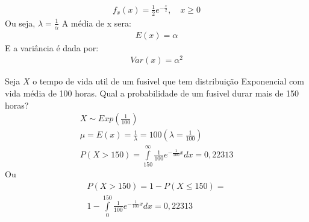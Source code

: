 \begin{description}
\begin{obs}
          \begin{align*}
            f_{x} (x)= \frac{1}{2}e^{-\frac{x}{2}}, \quad x\ge 0
          \end{align*}
          Ou seja, $\lambda= \frac{1}{\alpha}$
          A média de x sera:
          \begin{align*}
            E(x)  = \alpha
          \end{align*}
          E a variância é dada por:
          \begin{align*}
            Var(x) = \alpha^2
          \end{align*}
        \end{obs}
        \begin{example}Seja $X$ o tempo de vida util de um fusivel que tem distribuição Exponencial
          com vida média de 100 horas. Qual a probabilidade de um fusivel durar mais de 150
          horas?
          \begin{align*}
            X \sim  Exp(\frac{1}{100}) \\
            \mu = E(x)= \frac{1}{\lambda}=100 \left( \lambda= \frac{1}{100} \right)\\
            P(X> 150)= \int \limits_{150}^{\infty} \frac{1}{100} e^{- \frac{1}{100} x} dx =0,22313
          \end{align*}
          Ou 
          \begin{align*}
            P(X>150) = 1- P(X \le 150)=\\ 1- \int \limits_{0}^{150} \frac{1}{100} e^{- \frac{1}{100}x}dx          = 0,22313
          \end{align*}
      \end{example}
  \end{description}
